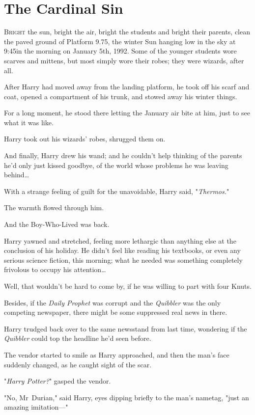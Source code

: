 \chapter{The Cardinal Sin}

\lettrine{B}{right} the sun,
bright the air, bright the students and bright their parents, clean the paved
ground of Platform 9.75, the winter Sun hanging low in the sky at 9:45\AM in the
morning on January 5th, 1992. Some of the younger students wore scarves and
mittens, but most simply wore their robes; they were wizards, after all.

After Harry had moved away from the landing platform, he took off his scarf and
coat, opened a compartment of his trunk, and stowed away his winter things.

For a long moment, he stood there letting the January air bite at him, just to
see what it was like.

Harry took out his wizards’ robes, shrugged them on.

And finally, Harry drew his wand; and he couldn’t help thinking of the parents
he’d only just kissed goodbye, of the world whose problems he was leaving
behind…

With a strange feeling of guilt for the unavoidable, Harry said,
"\emph{Thermos.}"

The warmth flowed through him.

And the Boy-Who-Lived was back.

Harry yawned and stretched, feeling more lethargic than anything else at the
conclusion of his holiday. He didn’t feel like reading his textbooks, or even
any serious science fiction, this morning; what he needed was something
completely frivolous to occupy his attention…

Well, that wouldn’t be hard to come by, if he was willing to part with four
Knuts.

Besides, if the \emph{Daily Prophet} was corrupt and the \emph{Quibbler} was
the only competing newspaper, there might be some suppressed real news in there.

Harry trudged back over to the same newsstand from last time, wondering if the
\emph{Quibbler} could top the headline he’d seen before.

The vendor started to smile as Harry approached, and then the man’s face
suddenly changed, as he caught sight of the scar.

"\emph{Harry Potter?}" gasped the vendor.

"No, Mr~Durian," said Harry, eyes dipping briefly to the man’s nametag, "just
an amazing imitation—"

